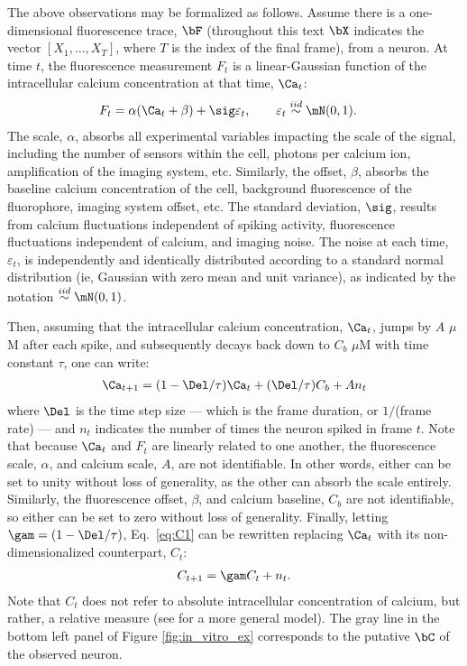 The above observations may be formalized as follows. Assume there is a one-dimensional fluorescence trace, $\bF$ (throughout this text $\bX$ indicates the vector $[X_1, \ldots, X_T]$, where $T$ is the index of the final frame), from a neuron.  At time $t$, the fluorescence measurement $F_t$ is a linear-Gaussian function of the intracellular calcium concentration at that time, $\Ca_t$:
\begin{align} \label{eq:F}
F_t &= \alpha (\Ca_t + \beta) + \sig \varepsilon_t, \qquad \varepsilon_t \overset{iid}{\sim} \mN(0,1).
\end{align}
\noindent The scale, $\alpha$, absorbs all experimental variables impacting the scale of the signal, including the number of sensors within the cell, photons per calcium ion, amplification of the imaging system, etc.  Similarly, the offset, $\beta$, absorbs the baseline calcium concentration of the cell, background fluorescence of the fluorophore, imaging system offset, etc.  The standard deviation, $\sig$, results from calcium fluctuations independent of spiking activity, fluorescence fluctuations independent of calcium, and imaging noise. The noise at each time, $\varepsilon_t$, is independently and identically distributed according to a standard normal distribution (ie, Gaussian with zero mean and unit variance), as indicated by the notation $\overset{iid}{\sim}\mN(0,1)$. 

Then, assuming that the intracellular calcium concentration, $\Ca_t$, jumps by $A$ $\mu$M after each spike, and subsequently decays back down to $C_b$ $\mu$M with time constant $\tau$, one can write:
\begin{align} \label{eq:C1}
\Ca_{t+1} = (1- \Del/\tau ) \Ca_t + (\Del/\tau) C_b + A n_t
\end{align}
\noindent where $\Del$ is the time step size --- which is the frame duration, or $1/$(frame rate) --- and $n_t$ indicates the number of times the neuron spiked in frame $t$. %
Note that because $\Ca_t$ and $F_t$ are linearly related to one another, the fluorescence scale, $\alpha$, and calcium scale, $A$, are not identifiable.  In other words, either can be set to unity without loss of generality, as the other can absorb the scale entirely. Similarly, the fluorescence offset, $\beta$, and calcium baseline, $C_b$ are not identifiable, so either can be set to zero without loss of generality.  Finally, letting $\gam=(1-\Del/\tau)$, Eq.~\eqref{eq:C1} can be rewritten replacing $\Ca_t$ with its non-dimensionalized counterpart, $C_t$: 
\begin{align} \label{eq:C2}
	 C_{t+1}=\gam C_t + n_t.
\end{align} 
\noindent Note that $C_t$ does not refer to absolute intracellular concentration of calcium, but rather, a relative measure (see \cite{VogelsteinPaninski09} for a more general model).  The gray line in the bottom left panel of Figure \ref{fig:in_vitro_ex} corresponds to the putative $\bC$ of the observed neuron.  

